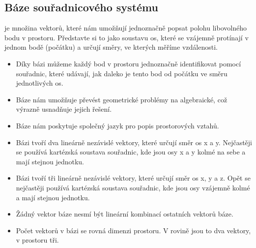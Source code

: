 \documentclass[letterpaper,10pt,english]{jupyterBook}
\begin{document}
\subsection{Báze souřadnicového systému}
\label{\detokenize{Prednasky/0_3_Sou_u0159adnicov_xe9_syst_xe9my:baze-souradnicoveho-systemu}}
\sphinxAtStartPar
{} je množina vektorů, které nám umožňují jednoznačně popsat polohu libovolného bodu v prostoru. Představte si to jako soustavu os, které se vzájemně protínají v jednom bodě (počátku) a určují směry, ve kterých měříme vzdálenosti.

\sphinxAtStartPar
{}
\begin{itemize}
\item {} 
\sphinxAtStartPar
{} Díky bázi můžeme každý bod v prostoru jednoznačně identifikovat pomocí souřadnic, které udávají, jak daleko je tento bod od počátku ve směru jednotlivých os.

\item {} 
\sphinxAtStartPar
{} Báze nám umožňuje převést geometrické problémy na algebraické, což výrazně usnadňuje jejich řešení.

\item {} 
\sphinxAtStartPar
{} Báze nám poskytuje společný jazyk pro popis prostorových vztahů.

\end{itemize}

\sphinxAtStartPar
{}
\begin{itemize}
\item {} 
\sphinxAtStartPar
{} Bázi tvoří dva lineárně nezávislé vektory, které určují směr os x a y. Nejčastěji se používá kartézská soustava souřadnic, kde jsou osy x a y kolmé na sebe a mají stejnou jednotku.

\item {} 
\sphinxAtStartPar
{} Bázi tvoří tři lineárně nezávislé vektory, které určují směr os x, y a z. Opět se nejčastěji používá kartézská soustava souřadnic, kde jsou osy vzájemně kolmé a mají stejnou jednotku.

\end{itemize}

\sphinxAtStartPar
{}
\begin{itemize}
\item {} 
\sphinxAtStartPar
{} Žádný vektor báze nesmí být lineární kombinací ostatních vektorů báze.

\item {} 
\sphinxAtStartPar
{} Počet vektorů v bázi se rovná dimenzi prostoru. V rovině jsou to dva vektory, v prostoru tři.

\end{itemize}
\end{document}
